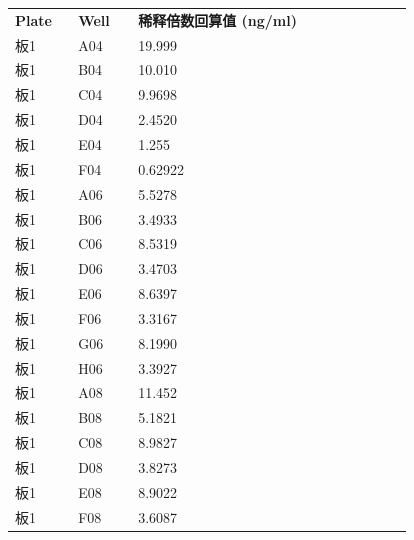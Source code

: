 \documentclass[UTF8,10pt,a4paper,fontset=fandol]{ctexart}
\newcommand{\fieldvalue}[1]{#1}
\begin{document}
\begin{tabular}{p{0.12\linewidth}p{0.12\linewidth}p{0.55\linewidth}}
\textbf{Plate} & \textbf{Well} & \textbf{稀释倍数回算值 (ng/ml)}\\
板1 & A04 &
\fieldvalue{19.999}\\
板1 & B04 &
\fieldvalue{10.010}\\
板1 & C04 &
\fieldvalue{9.9698}\\
板1 & D04 &
\fieldvalue{2.4520}\\
板1 & E04 &
\fieldvalue{1.255}\\
板1 & F04 &
\fieldvalue{0.62922}\\
板1 & A06 &
\fieldvalue{5.5278}\\
板1 & B06 &
\fieldvalue{3.4933}\\
板1 & C06 &
\fieldvalue{8.5319}\\
板1 & D06 &
\fieldvalue{3.4703}\\
板1 & E06 &
\fieldvalue{8.6397}\\
板1 & F06 &
\fieldvalue{3.3167}\\
板1 & G06 &
\fieldvalue{8.1990}\\
板1 & H06 &
\fieldvalue{3.3927}\\
板1 & A08 &
\fieldvalue{11.452}\\
板1 & B08 &
\fieldvalue{5.1821}\\
板1 & C08 &
\fieldvalue{8.9827}\\
板1 & D08 &
\fieldvalue{3.8273}\\
板1 & E08 &
\fieldvalue{8.9022}\\
板1 & F08 &
\fieldvalue{3.6087}
\end{tabular}
\end{document}

